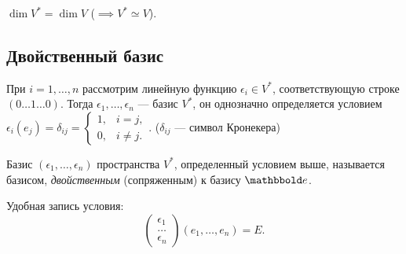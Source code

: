 \begin{corollary}
    $\dim V^{*} = \dim V$ ($\implies V^{*} \simeq V$).
\end{corollary}


\subsection{Двойственный базис}

При $i = 1, \dots, n$ рассмотрим линейную функцию $\epsilon_i \in V^{*}$, соответствующую строке $(0 \dots 1 \dots 0)$. Тогда $\epsilon_1, \dots, \epsilon_n$ --- базис $V^{*}$, он однозначно определяется условием $\epsilon_i(e_j) = \delta_{ij} = \begin{cases}
    1, &i = j, \\
    0, &i \neq j.
\end{cases}$. ($\delta_{ij}$ --- символ Кронекера)


\begin{definition}
    Базис $(\epsilon_1, \dots, \epsilon_n)$ пространства $V^{*}$, определенный условием выше, называется базисом, \textit{двойственным} (сопряженным) к базису $\E$.

    Удобная запись условия:
    \begin{equation*}
        \begin{pmatrix} \epsilon_1 \\ \dots \\ \epsilon_n \end{pmatrix} (e_1, \dots, e_n) = E
    .\end{equation*}
\end{definition}
